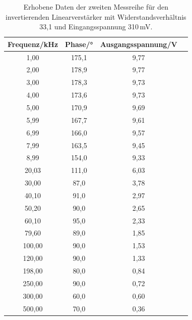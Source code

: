                 \begin{table}
                    \centering
                    \caption{Erhobene Daten der zweiten Messreihe für den invertierenden Linearverstärker 
                    mit Widerstandsverhältnis 33,1 und Eingangsspannung 310\,mV.}
                    \label{tab:inv3}
                    \begin{tabular}{c c c c}
                        \toprule
                            Frequenz/kHz & Phase/° & Ausgangsspannung/V \\
                        \midrule
                            1,00 & 175,1 & 9,77\\
                            2,00 & 178,9 & 9,77\\ 
                            3,00 & 178,3 & 9,73\\ 
                            4,00 & 173,6 & 9,73\\
                            5,00 & 170,9 & 9,69\\
                            5,99 & 167,7 & 9,61\\
                            6,99 & 166,0 & 9,57\\
                            7,99 & 163,5 & 9,45\\
                            8,99 & 154,0 & 9,33\\
                           20,03 & 111,0 & 6,03\\
                           30,00 &  87,0 & 3,78\\
                           40,10 &  91,0 & 2,97\\
                           50,20 &  90,0 & 2,65\\
                           60,10 &  95,0 & 2,33\\
                           79,60 &  89,0 & 1,85\\
                          100,00 &  90,0 & 1,53\\
                          120,00 &  90,0 & 1,33\\
                          198,00 &  80,0 & 0,84\\
                          250,00 &  90,0 & 0,72\\
                          300,00 &  60,0 & 0,60\\
                          500,00 &  70,0 & 0,36\\
                        \bottomrule
                    \end{tabular}
                \end{table}            

